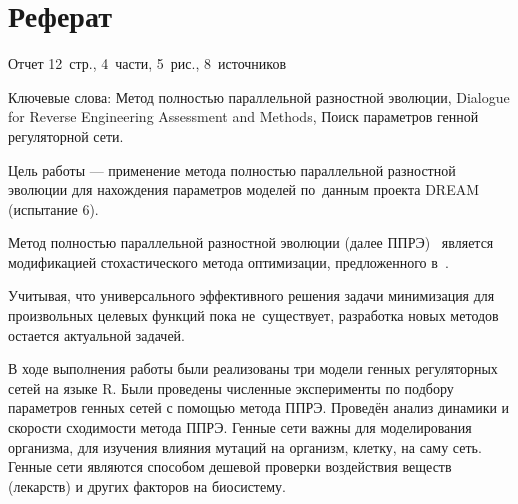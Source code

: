 \chapter*{Реферат}							%

Отчет 12~стр., 4~части, 5~рис., 8~источников

Ключевые слова: Метод полностью параллельной разностной эволюции, Dialogue for 
Reverse Engineering Assessment and Methods, Поиск параметров генной регуляторной 
сети.

Цель работы — применение метода полностью параллельной разностной эволюции для 
нахождения параметров моделей по~данным проекта DREAM (испытание 6).

Метод полностью параллельной разностной эволюции (далее ППРЭ)~\cite{bib2,bib5} 
является модификацией стохастического метода оптимизации, предложенного 
в~\cite{bib1}. 

Учитывая, что универсального эффективного решения задачи минимизация для 
произвольных целевых функций пока не~существует, разработка новых методов 
остается актуальной задачей. 

В ходе выполнения работы были реализованы три модели генных регуляторных сетей
на языке R. Были проведены численные эксперименты по подбору параметров генных
сетей с помощью метода ППРЭ. Проведён анализ динамики и скорости сходимости 
метода ППРЭ. Генные сети важны для моделирования организма, для изучения влияния
мутаций на организм, клетку, на саму сеть. Генные сети являются способом дешевой
проверки воздействия веществ (лекарств) и других факторов на биосистему.


\clearpage
